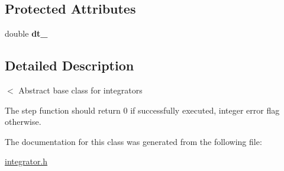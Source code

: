 \subsection*{Protected Attributes}
\begin{DoxyCompactItemize}
\item 
\hypertarget{classintegrator_1_1Integrator_a1daaed86f9843a363b0a10ad4004531c}{double {\bfseries dt\-\_\-}}\label{classintegrator_1_1Integrator_a1daaed86f9843a363b0a10ad4004531c}

\end{DoxyCompactItemize}


\subsection{Detailed Description}
$<$ Abstract base class for integrators 

The step function should return 0 if successfully executed, integer error flag otherwise. 

The documentation for this class was generated from the following file\-:\begin{DoxyCompactItemize}
\item 
\hyperlink{integrator_8h}{integrator.\-h}\end{DoxyCompactItemize}

